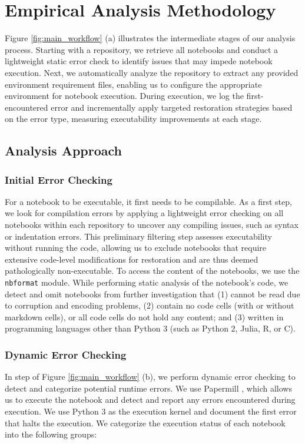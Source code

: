 \section{Empirical Analysis Methodology}
\label{sec:approach}



Figure \ref{fig:main_workflow} (a) illustrates the intermediate stages of our analysis process. Starting with a repository, we retrieve all notebooks and conduct a lightweight static error check to identify issues that may impede notebook execution. Next, we automatically analyze the repository to extract any provided environment requirement files, enabling us to configure the appropriate environment for notebook execution. During execution, we log the first-encountered error and incrementally apply targeted restoration strategies based on the error type, measuring executability improvements at each stage. 


\subsection{Analysis Approach}
\label{analysis_approach}



    \subsubsection{Initial Error Checking}
        For a notebook to be executable, it first needs to be compilable. As a first step, we look for compilation errors by applying a lightweight error checking on all notebooks within each repository to uncover any compiling issues, such as syntax or indentation errors. This preliminary filtering step assesses executability without running the code, allowing us to exclude notebooks that require extensive code-level modifications for restoration and are thus deemed pathologically non-executable. To access the content of the notebooks, we use the {\small{\texttt{nbformat}}} module. While performing static analysis of the notebook's code, we detect and omit notebooks from further investigation that (1) cannot be read due to corruption and encoding problems, (2) contain no code cells (with or without markdown cells), or all code cells do not hold any content; and (3) written in programming languages other than Python 3 (such as Python 2, Julia, R, or C). 
    

    \subsubsection{Dynamic Error Checking} 
        \label{dynamic-error-checking}
        In step  of Figure \ref{fig:main_workflow} (b), we perform dynamic error checking to detect and categorize potential runtime errors. We use Papermill \cite{papermill}, which allows us to execute the notebook and detect and report any errors encountered during execution. We use Python 3 as the execution kernel and document the first error that halts the execution. We categorize the execution status of each notebook into the following groups:
    
